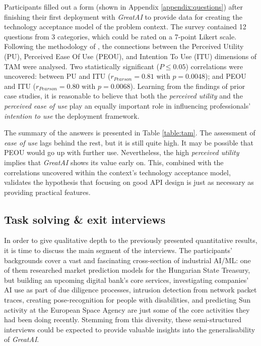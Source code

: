 Participants filled out a form (shown in Appendix \ref{appendix:questions}) after finishing their first deployment with \textit{GreatAI} to provide data for creating the technology acceptance model of the problem context. The survey contained 12 questions from 3 categories, which could be rated on a 7-point Likert scale. Following the methodology of \cite{cruz2019catalog}, the connections between the Perceived Utility (PU), Perceived Ease Of Use (PEOU), and Intention To Use (ITU) dimensions of TAM were analysed. Two statistically significant ($P \leq 0.05$) correlations were uncovered: between PU and ITU ($r_{Pearson} = 0.81$ with $p = 0.0048$); and PEOU and ITU ($r_{Pearson} = 0.80$ with $p = 0.0068$). Learning from the findings of prior case studies, it is reasonable to believe that both the \textit{perceived utility} and the \textit{perceived ease of use} play an equally important role in influencing professionals' \textit{intention to use} the deployment framework.

The summary of the answers is presented in Table \ref{table:tam}. The assessment of \textit{ease of use} lags behind the rest, but it is still quite high. It may be possible that PEOU would go up with further use. Nevertheless, the high \textit{perceived utility} implies that \textit{GreatAI} shows its value early on. This, combined with the correlations uncovered within the context's technology acceptance model, validates the hypothesis that focusing on good API design is just as necessary as providing practical features.

\subsection{Task solving \& exit interviews}

In order to give qualitative depth to the previously presented quantitative results, it is time to discuss the main segment of the interviews. The participants' backgrounds cover a vast and fascinating cross-section of industrial AI/ML: one of them researched market prediction models for the Hungarian State Treasury, but building an upcoming digital bank's core services, investigating companies' AI use as part of due diligence processes, intrusion detection from network packet traces, creating pose-recognition for people with disabilities, and predicting Sun activity at the European Space Agency are just some of the core activities they had been doing recently. Stemming from this diversity, these semi-structured interviews could be expected to provide valuable insights into the generalisability of \textit{GreatAI}.

